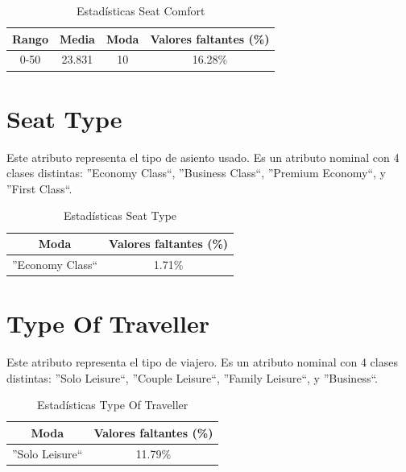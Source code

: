 \documentclass[12pt]{report} %
\begin{document}
    \begin{table}[H]
        \begin{center}
            \begin{tabular}{ @{}cccc@{} }
                \toprule
                Rango & Media & Moda & Valores faltantes (\%) \\
                \midrule
                0-50 & 23.831 & 10 & 16.28\% \\
                \bottomrule
            \end{tabular}
            \caption{Estadísticas Seat Comfort}
        \end{center}
    \end{table}

    \section{Seat Type}

    Este atributo representa el tipo de asiento usado. Es un atributo nominal con 4
    clases distintas: ''Economy Class``, ''Business Class``, ''Premium Economy``, y ''First Class``.

    \begin{table}[H]
        \begin{center}
            \begin{tabular}{ @{}cc@{} }
                \toprule
                Moda & Valores faltantes (\%) \\
                \midrule
                ''Economy Class`` & 1.71\% \\
                \bottomrule
            \end{tabular}
            \caption{Estadísticas Seat Type}
        \end{center}
    \end{table}

    \section{Type Of Traveller}

    Este atributo representa el tipo de viajero. Es un atributo nominal con 4
    clases distintas: ''Solo Leisure``, ''Couple Leisure``, ''Family Leisure``, y ''Business``.

    \begin{table}[H]
        \begin{center}
            \begin{tabular}{ @{}cc@{} }
                \toprule
                Moda & Valores faltantes (\%) \\
                \midrule
                ''Solo Leisure`` & 11.79\% \\
                \bottomrule
            \end{tabular}
            \caption{Estadísticas Type Of Traveller}
        \end{center}
    \end{table}
\end{document}
